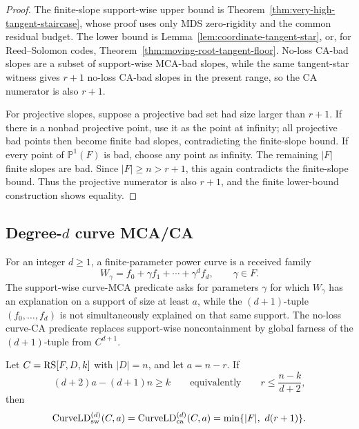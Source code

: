 \begin{proof}
The finite-slope support-wise upper bound is Theorem~\ref{thm:very-high-tangent-staircase},
whose proof uses only MDS zero-rigidity and the common residual budget.  The
lower bound is Lemma~\ref{lem:coordinate-tangent-star}, or, for Reed--Solomon
codes, Theorem~\ref{thm:moving-root-tangent-floor}.  No-loss CA-bad slopes are a
subset of support-wise MCA-bad slopes, while the same tangent-star witness gives
\(r+1\) no-loss CA-bad slopes in the present range, so the CA numerator is also
\(r+1\).

For projective slopes, suppose a projective bad set had size larger than
\(r+1\).  If there is a nonbad projective point, use it as the point at infinity;
all projective bad points then become finite bad slopes, contradicting the
finite-slope bound.  If every point of \(\mathbb P^1(F)\) is bad, choose any
point as infinity.  The remaining \(|F|\) finite slopes are bad.  Since
\(|F|\ge n>r+1\), this again contradicts the finite-slope bound.  Thus the
projective numerator is also \(r+1\), and the finite lower-bound construction
shows equality.
\end{proof}

\subsection{Degree-\texorpdfstring{$d$}{d} curve MCA/CA}

For an integer \(d\ge1\), a finite-parameter power curve is a received family
\[
  W_\gamma=f_0+\gamma f_1+\cdots+\gamma^d f_d,
  \qquad \gamma\in F .
\]
The support-wise curve-MCA predicate asks for parameters \(\gamma\) for which
\(W_\gamma\) has an explanation on a support of size at least \(a\), while the
\((d+1)\)-tuple \((f_0,\ldots,f_d)\) is not simultaneously explained on that
same support.  The no-loss curve-CA predicate replaces support-wise
noncontainment by global farness of the \((d+1)\)-tuple from \(C^{d+1}\).

\begin{theorem}
\label{thm:uniform-curve-staircase}
Let \(C=\operatorname{RS}[F,D,k]\) with \(|D|=n\), and let \(a=n-r\).  If
\[
  (d+2)a-(d+1)n\ge k
  \qquad\text{equivalently}\qquad
  r\le \frac{n-k}{d+2},
\]
then
\[
  \operatorname{CurveLD}_{\rm sw}^{(d)}(C,a)
  =
  \operatorname{CurveLD}_{\rm ca}^{(d)}(C,a)
  =
  \min\{|F|,\ d(r+1)\} .
\]
\end{theorem}

